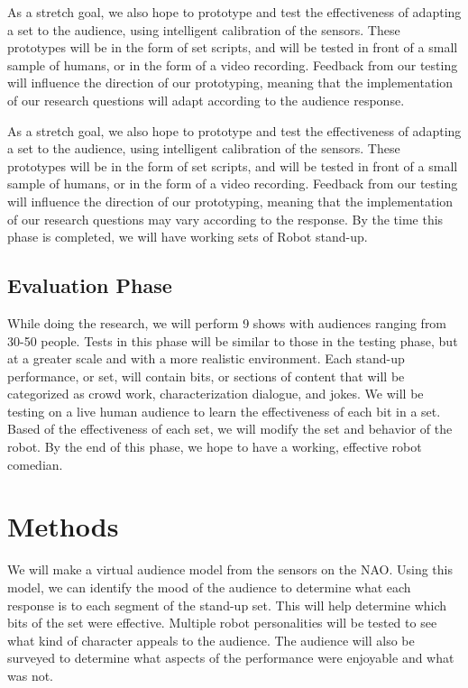 \documentclass[onecolumn, draftclsnofoot,10pt, compsoc]{IEEEtran}
\begin{document}
As a stretch goal, we also hope to prototype and test the effectiveness of adapting a set to the audience, using intelligent calibration of the sensors. These prototypes will be in the form of set scripts, and will be tested in front of a small sample of humans, or in the form of a video recording. Feedback from our testing will influence the direction of our prototyping, meaning that the implementation of our research questions will adapt according to the audience response.

As a stretch goal, we also hope to prototype and test the effectiveness of adapting a set to the audience, using intelligent calibration of the sensors. These prototypes will be in the form of set scripts, and will be tested in front of a small sample of humans, or in the form of a video recording. Feedback from our testing will influence the direction of our prototyping, meaning that the implementation of our research questions may vary according to the response. By the time this phase is completed, we will have working sets of Robot stand-up.

\subsection{Evaluation Phase}
While doing the research, we will perform 9 shows with audiences ranging from 30-50 people. Tests in this phase will be similar to those in the testing phase, but at a greater scale and with a more realistic environment. Each stand-up performance, or set, will contain bits, or sections of content that will be categorized as crowd work, characterization dialogue, and jokes. We will be testing on a live human audience to learn the effectiveness of each bit in a set. Based of the effectiveness of each set, we will modify the set and behavior of the robot. By the end of this phase, we hope to have a working, effective robot comedian.

\section{Methods}
We will make a virtual audience model from the sensors on the NAO. Using this model, we can identify the mood of the audience to determine what each response is to each segment of the stand-up set. This will help determine which bits of the set were effective. Multiple robot personalities will be tested to see what kind of character appeals to the audience. The audience will also be surveyed to determine what aspects of the performance were enjoyable and what was not.
\end{document}
